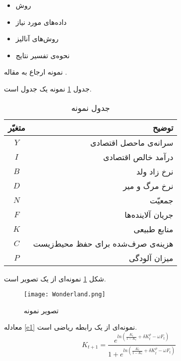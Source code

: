 
\label{method}
\begin{itemize}
\item
روش
\item
داده‌های مورد نیاز
\item
روش‌های آنالیز
\item
نحوه‌ی تفسیر نتایج
\end{itemize}

نمونه ارجاع به مقاله  .

جدول \ref{t1} نمونه یک جدول است.

\begin{center}
\begin{table}
\centering
\caption {‌جدول نمونه}
\begin{tabular}{cr}
\hline 
متغیّر &  توضیح \\ \hline
$ Y $ &  سرانه‌ی ماحصل اقتصادی \\ 
$ I $ &  درآمد خالص اقتصادی \\ 
$ B $ &  نرخ زاد ولد \\ 
$ D $ &  نرخ مرگ‌ و میر \\ 
$ N $ &  جمعیّت \\ 
$ F $ &  جریان آلاینده‌ها \\ 
$ K $ &  منابع طبیعی \\ 
$ C $ &  هزینه‌ی صرف‌شده برای حفظ محیط‌زیست \\ 
$ P $ &  میزان آلودگی \\  \hline 
\end{tabular}
\label{t1}
\end{table}
\end{center}

شکل \ref{f1} نمونه‌ای از یک تصویر است.

\begin{figure}%
	\centering
	\texttt{[image: Wonderland.png]}
	\caption{تصویر نمونه}
	\label{f1}
\end{figure}

معادله \ref{e1} نمونه‌ای از یک رابطه ریاضی است.
\begin{equation}
	\label{e1}
	K_{t+1}= \frac{e^{ln(\frac{K_t}{1-K_t}+\delta K_t^\rho - \omega F_t)}}{1+e^{ln(\frac{K_t}{1-K_t}+\delta K_t^\rho - \omega F_t)}}
\end{equation}
 
 